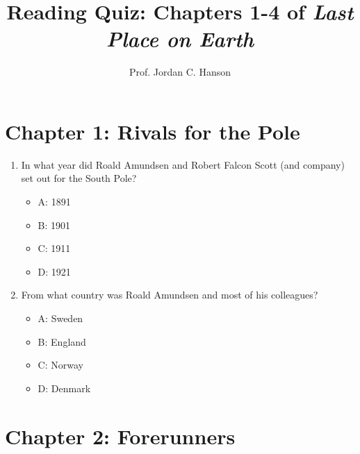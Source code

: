 \documentclass{article}
\begin{document}
\twocolumn

\title{Reading Quiz: Chapters 1-4 of \textit{Last Place on Earth}}
\author{Prof. Jordan C. Hanson}

\maketitle

\section{Chapter 1: Rivals for the Pole}

\begin{enumerate}
\item In what year did Roald Amundsen and Robert Falcon Scott (and company) set out for the South Pole?
\begin{itemize}
\item A: 1891
\item B: 1901
\item C: 1911
\item D: 1921
\end{itemize}
\item From what country was Roald Amundsen and most of his colleagues?
\begin{itemize}
\item A: Sweden
\item B: England
\item C: Norway
\item D: Denmark
\end{itemize}
\end{enumerate}

\section{Chapter 2: Forerunners}
\end{document}
